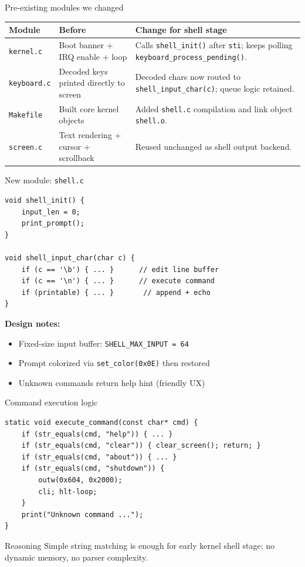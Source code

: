 \documentclass[aspectratio=169]{beamer}
\newcommand{\concept}[2]{%
  \begin{block}{#1}\smallskip #2\smallskip\end{block}\vspace{5pt}}
\begin{document}
\begin{frame}{Pre-existing modules we changed}
  \small
  \begin{tabular}{@{}p{2.4cm}p{3.7cm}p{5.7cm}@{}}
    \toprule
    \textbf{Module} & \textbf{Before} & \textbf{Change for shell stage} \\
    \midrule
    \texttt{kernel.c} & Boot banner + IRQ enable + loop & Calls \texttt{shell\_init()} after \texttt{sti}; keeps polling \texttt{keyboard\_process\_pending()}. \\
    \texttt{keyboard.c} & Decoded keys printed directly to screen & Decoded chars now routed to \texttt{shell\_input\_char(c)}; queue logic retained. \\
    \texttt{Makefile} & Built core kernel objects & Added \texttt{shell.c} compilation and link object \texttt{shell.o}. \\
    \texttt{screen.c} & Text rendering + cursor + scrollback & Reused unchanged as shell output backend. \\
    \bottomrule
  \end{tabular}
\end{frame}

\begin{frame}[fragile]{New module: \texttt{shell.c}}
\begin{lstlisting}[style=clang]
void shell_init() {
    input_len = 0;
    print_prompt();
}

void shell_input_char(char c) {
    if (c == '\b') { ... }      // edit line buffer
    if (c == '\n') { ... }      // execute command
    if (printable) { ... }       // append + echo
}
\end{lstlisting}
\textbf{Design notes:}
\begin{itemize}
  \item Fixed-size input buffer: \texttt{SHELL\_MAX\_INPUT = 64}
  \item Prompt colorized via \texttt{set\_color(0x0E)} then restored
  \item Unknown commands return help hint (friendly UX)
\end{itemize}
\end{frame}

\begin{frame}[fragile]{Command execution logic}
\begin{lstlisting}[style=clang]
static void execute_command(const char* cmd) {
    if (str_equals(cmd, "help")) { ... }
    if (str_equals(cmd, "clear")) { clear_screen(); return; }
    if (str_equals(cmd, "about")) { ... }
    if (str_equals(cmd, "shutdown")) {
        outw(0x604, 0x2000);
        cli; hlt-loop;
    }
    print("Unknown command ...");
}
\end{lstlisting}
\concept{Reasoning}{
  Simple string matching is enough for early kernel shell stage; no dynamic memory, no parser complexity.
}
\end{frame}
\end{document}
